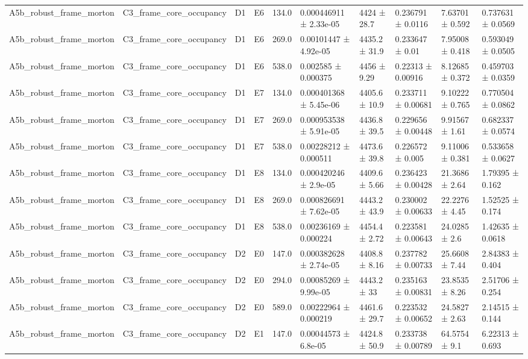 \begin{table}
\begin{tabular}{llllllllll}
A5b\_robust\_frame\_morton & C3\_frame\_core\_occupancy & D1 & E6 & 134.0 & 0.000446911 ± 2.33e-05 & 4424 ± 28.7 & 0.236791 ± 0.0116 & 7.63701 ± 0.592 & 0.737631 ± 0.0569 \\
A5b\_robust\_frame\_morton & C3\_frame\_core\_occupancy & D1 & E6 & 269.0 & 0.00101447 ± 4.92e-05 & 4435.2 ± 31.9 & 0.233647 ± 0.01 & 7.95008 ± 0.418 & 0.593049 ± 0.0505 \\
A5b\_robust\_frame\_morton & C3\_frame\_core\_occupancy & D1 & E6 & 538.0 & 0.002585 ± 0.000375 & 4456 ± 9.29 & 0.22313 ± 0.00916 & 8.12685 ± 0.372 & 0.459703 ± 0.0359 \\
A5b\_robust\_frame\_morton & C3\_frame\_core\_occupancy & D1 & E7 & 134.0 & 0.000401368 ± 5.45e-06 & 4405.6 ± 10.9 & 0.233711 ± 0.00681 & 9.10222 ± 0.765 & 0.770504 ± 0.0862 \\
A5b\_robust\_frame\_morton & C3\_frame\_core\_occupancy & D1 & E7 & 269.0 & 0.000953538 ± 5.91e-05 & 4436.8 ± 39.5 & 0.229656 ± 0.00448 & 9.91567 ± 1.61 & 0.682337 ± 0.0574 \\
A5b\_robust\_frame\_morton & C3\_frame\_core\_occupancy & D1 & E7 & 538.0 & 0.00228212 ± 0.000511 & 4473.6 ± 39.8 & 0.226572 ± 0.005 & 9.11006 ± 0.381 & 0.533658 ± 0.0627 \\
A5b\_robust\_frame\_morton & C3\_frame\_core\_occupancy & D1 & E8 & 134.0 & 0.000420246 ± 2.9e-05 & 4409.6 ± 5.66 & 0.236423 ± 0.00428 & 21.3686 ± 2.64 & 1.79395 ± 0.162 \\
A5b\_robust\_frame\_morton & C3\_frame\_core\_occupancy & D1 & E8 & 269.0 & 0.000826691 ± 7.62e-05 & 4443.2 ± 43.9 & 0.230002 ± 0.00633 & 22.2276 ± 4.45 & 1.52525 ± 0.174 \\
A5b\_robust\_frame\_morton & C3\_frame\_core\_occupancy & D1 & E8 & 538.0 & 0.00236169 ± 0.000224 & 4454.4 ± 2.72 & 0.223581 ± 0.00643 & 24.0285 ± 2.6 & 1.42635 ± 0.0618 \\
A5b\_robust\_frame\_morton & C3\_frame\_core\_occupancy & D2 & E0 & 147.0 & 0.000382628 ± 2.74e-05 & 4408.8 ± 8.16 & 0.237782 ± 0.00733 & 25.6608 ± 7.44 & 2.84383 ± 0.404 \\
A5b\_robust\_frame\_morton & C3\_frame\_core\_occupancy & D2 & E0 & 294.0 & 0.00085269 ± 9.99e-05 & 4443.2 ± 33 & 0.235163 ± 0.00831 & 23.8535 ± 8.26 & 2.51706 ± 0.254 \\
A5b\_robust\_frame\_morton & C3\_frame\_core\_occupancy & D2 & E0 & 589.0 & 0.00222964 ± 0.000219 & 4461.6 ± 29.7 & 0.223532 ± 0.00652 & 24.5827 ± 2.63 & 2.14515 ± 0.144 \\
A5b\_robust\_frame\_morton & C3\_frame\_core\_occupancy & D2 & E1 & 147.0 & 0.00044573 ± 6.8e-05 & 4424.8 ± 50.9 & 0.233738 ± 0.00789 & 64.5754 ± 9.1 & 6.22313 ± 0.693 \\

\end{tabular}
\end{table}
